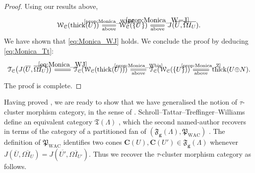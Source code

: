 \documentclass[10pt,twoside, a4paper,reqno]{amsart}
\DeclareMathOperator{\thick}{thick}
\newcommand{\partfan}[1]{\mathfrak{F}_{\bfg}(#1)}
\newcommand{\calC}{\mathcal{C}}
\newcommand{\calT}{\mathcal{T}}
\newcommand{\calW}{\mathcal{W}}
\newcommand{\boldC}{\mathbf{C}}
\newcommand{\bfg}{\mathbf{g}}
\theoremstyle{definition}
\begin{document}
\begin{proof}
    {Using our results above,}
\begin{equation*}\label{eq:Gar24Bor21w'}
\begin{tikzcd}[column sep=2em]
\calW_{{\calC}}(\thick(U)) \arrow[r, "{\text{\eqref{prop:Monica_Wbis}}}", "\text{above}"', equal] & \calW_{{{\calC}}}(\{U\}) \arrow[r, equal] \arrow[r, equal,"{\eqref{prop:Monica_W=J}}", "\text{{above}}"']  & J(\overline{U},\overline{\Omega I_U}).
\end{tikzcd}
\end{equation*}
We have shown that \eqref{eq:Monica_WJ} holds.
We conclude the proof by deducing \eqref{eq:Monica_Tt}:
\begin{equation*}
\begin{tikzcd}
\calT_{\calC}\big(J(\overline{U},\overline{\Omega I_U})\big) \arrow[r, "\eqref{eq:Monica_WJ}", equal]  &  {\calT_{\calC}(\calW_{\calC}(\thick(U))) }  \arrow[r, "{{\text{\eqref{prop:Monica_Wbis}}}}", "\text{{above}}"', equal]  & \calT_{\calC}{(} \calW_{\calC}(\{U\}){)}\arrow[r, "{{\text{\eqref{prop:Monica_Z}}}}", "\text{{above}}"', equal]  & \thick(U {\oplus N}).
\end{tikzcd}
\end{equation*}
The proof is complete.
\end{proof}

Having proved , we are ready to show that we have generalised the notion of $\tau$-cluster morphism category, in the sense of \cite{IT17,BH21,BM18w}. 
Schroll--Tattar--Treffinger--Williams define an equivalent category $\mathfrak{T}(\Lambda)$ \cite[{Thm. 1.1}]{STTW23}, which the second named-author recovers in terms of the category of a partitioned fan {of} $(\partfan{\Lambda},\mathfrak{P}_{\mathrm{WAC}})$ \cite[§6.3]{Kai23}. The definition of $\mathfrak{P}_{\mathrm{WAC}}$ identifies two cones $\boldC(U), \boldC(U') \in \partfan{\Lambda}$ whenever $J(\overline{U}, \overline{\Omega I_U})= J(\overline{U'}, \overline{\Omega I_{U'}})$. Thus we recover the $\tau$-cluster morphism category as follows.
\end{document}

